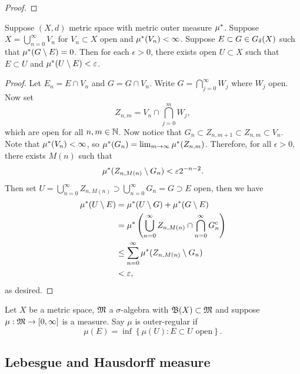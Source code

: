 \documentclass[a4paper]{article}
\renewcommand{\cupinfn}{\bigcup_{n=0}^\infty}
\renewcommand{\capinfn}{\bigcap_{n=0}^\infty}
\renewcommand{\suminfn}{\sum_{n=0}^\infty}
\begin{document}
\begin{proof}
\end{proof}

\begin{lemma}
  Suppose $(X, d)$ metric space with metric outer measure $\mu^*$. Suppose
  $X = \cupinfn V_n$ for $V_n \subset X$ open and $\mu^*(V_n) < \infty$.
  Suppose $E \subset G \in G_\delta(X)$ such that $\mu^*(G \setminus E) = 0$.
  Then for each $\epsilon > 0$, there exists open $U \subset X$ such that
  $E \subset U$ and $\mu^*(U \setminus E) < \varepsilon$.

\end{lemma}

\begin{proof}

  Let $E_n = E \cap V_n$ and $G = G \cap V_n$. Write $G =
  \bigcap_{j=0}^\infty W_j$ where $W_j$ open. Now set
  \[
    Z_{n, m} = V_n \cap \bigcap_{j=0}^m W_j,
  \]
  which are open for all $n, m \in \mathbb{N}$. Now notice that $G_n \subset Z_{n,
  m+1} \subset Z_{n,m} \subset V_n$. Note that $\mu^*(V_n) < \infty$, so
  $\mu^*(G_n) = \lim_{m \to \infty} \mu^*(Z_{n, m})$. Therefore, for all
  $\epsilon > 0$, there exists $M(n)$ such that
  \[
    \mu^*(Z_{n, M(n)} \setminus G_n) < \varepsilon 2^{-n-2}.
  \]
  Then set $U = \cupinfn Z_{n, M(n)} \supset \cupinfn G_n = G \supset E$
  open, then we have
  \[
    \begin{aligned}
      \om(U \setminus E)
       & = \om(U \setminus G) + \om(G \setminus E)    \\
       & = \om \left( \cupinfn Z_{n, M(n)} \cap
      \capinfn G_n^c \right)                          \\
       & \leq \suminfn \om(Z_{n, M(n)} \setminus G_n) \\
       & < \epsilon,
    \end{aligned}
  \]
  as desired.

\end{proof}

\begin{defi}
  Let $X$ be a metric space, $\mathfrak{M}$ a $\sigma$-algebra
  with $\mathfrak{B}(X) \subset \mathfrak{M}$ and suppose $\mu: \mathfrak{M} \to [0, \infty]$
  is a measure. Say $\mu$ is outer-regular if
  \[
    \mu(E) = \inf \left\{ \mu(U) : E \subset U \text{ open} \right\}.
  \]
\end{defi}

\subsection{Lebesgue and Hausdorff measure}
\end{document}
